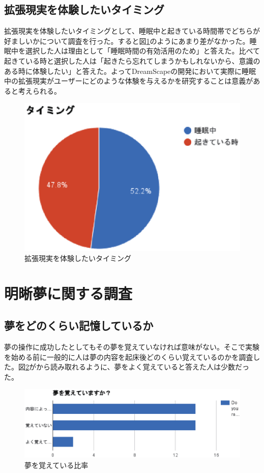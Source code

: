 \subsection{拡張現実を体験したいタイミング}
拡張現実を体験したいタイミングとして、睡眠中と起きている時間帯でどちらが好ましいかについて調査を行った。すると図\ref{VRtiming}のようにあまり差がなかった。睡眠中を選択した人は理由として「睡眠時間の有効活用のため」と答えた。比べて起きている時と選択した人は「起きたら忘れてしまうかもしれないから、意識のある時に体験したい」と答えた。よってDreamScapeの開発において実際に睡眠中の拡張現実がユーザーにどのような体験を与えるかを研究することは意義があると考えられる。

\begin{figure}[htbp]
\begin{center}
\includegraphics[width=15cm]{eps/timing.eps}
\caption{拡張現実を体験したいタイミング}
\label{VRtiming}
\end{center}
\end{figure}

\section{明晰夢に関する調査}
\subsection{夢をどのくらい記憶しているか}
夢の操作に成功したとしてもその夢を覚えていなければ意味がない。そこで実験を始める前に一般的に人は夢の内容を起床後どのくらい覚えているのかを調査した。図\ref{rememberDream}がから読み取れるように、夢をよく覚えていると答えた人は少数だった。

\begin{figure}[htbp]
\begin{center}
\includegraphics[width=15cm]{eps/remember.eps}
\caption{夢を覚えている比率}
\label{rememberDream}
\end{center}
\end{figure}

